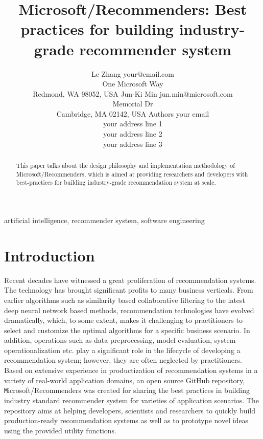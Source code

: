 \documentclass[twoside,11pt]{article}
\begin{document}
\title{Microsoft/Recommenders: Best practices for building industry-grade recommender system}

\author{\name Le Zhang \email your@email.com \\
       \addr One Microsoft Way \\
       Redmond, WA 98052, USA
       \AND
       \name Jun-Ki Min \email jun.min@microsoft.com \\
        Memorial Dr \\
       Cambridge, MA 02142, USA
       \AND
       \name Authors \email your email \\
       \addr your address line 1 \\
       \addr your address line 2 \\
       \addr your address line 3}


\maketitle

\begin{abstract}%
  This paper talks about the design philosophy and implementation methodology of Microsoft/Recommenders, which is aimed at providing researchers and developers with best-practices for building  industry-grade recommendation system at scale.
\end{abstract}

\begin{keywords}
  artificial intelligence, recommender system, software engineering
\end{keywords}

\section{Introduction}
Recent decades have witnessed a great proliferation of recommendation systems. The technology has brought significant profits to many business verticals. From earlier algorithms such as similarity based collaborative filtering to the latest deep neural network based methods, recommendation technologies have evolved dramatically, which, to some extent, makes it challenging to practitioners to select and customize the optimal algorithms for a specific business scenario. In addition, operations such as data preprocessing, model evaluation, system operationalization etc. play a significant role in the lifecycle of developing a recommendation system; however, they are often neglected by practitioners. 
Based on extensive experience in productization of recommendation systems in a variety of real-world application domains, an open source GitHub repository, \texttt Microsoft/Recommenders was created for sharing the best practices in building industry standard recommender system for varieties of application scenarios. The repository aims at helping developers, scientists and researchers to quickly build production-ready recommendation systems as well as to prototype novel ideas using the provided utility functions.
\end{document}
